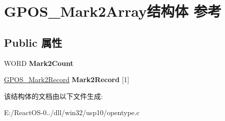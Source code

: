 \hypertarget{struct_g_p_o_s___mark2_array}{}\section{G\+P\+O\+S\+\_\+\+Mark2\+Array结构体 参考}
\label{struct_g_p_o_s___mark2_array}
\subsection*{Public 属性}
\begin{DoxyCompactItemize}
\item 
\mbox{\label{struct_g_p_o_s___mark2_array_a3a60bc0e53c3eb871755da5e5d429e36}} 
W\+O\+RD {\bfseries Mark2\+Count}
\item 
\mbox{\label{struct_g_p_o_s___mark2_array_a97dd3cf0ef6b986a97b560d2a9a676ef}} 
\hyperlink{struct_g_p_o_s___mark2_record}{G\+P\+O\+S\+\_\+\+Mark2\+Record} {\bfseries Mark2\+Record} \mbox{[}1\mbox{]}
\end{DoxyCompactItemize}


该结构体的文档由以下文件生成\+:\begin{DoxyCompactItemize}
\item 
E\+:/\+React\+O\+S-\/0../dll/win32/usp10/opentype.\+c\end{DoxyCompactItemize}
